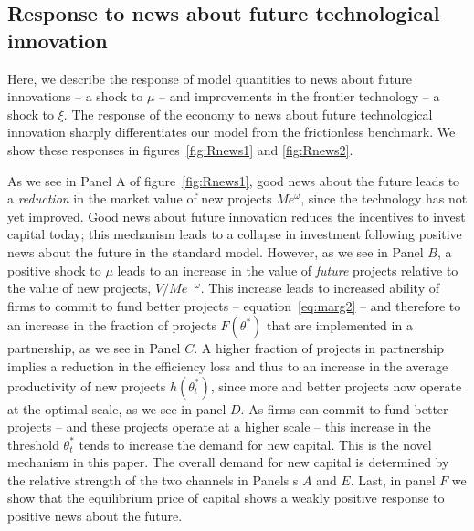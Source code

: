 \documentclass[12pt]{article}
\begin{document}



\subsection{Response to news about future technological innovation}

Here, we describe the response of model quantities to news about future innovations -- a shock to $\mu$  -- and improvements in the frontier technology -- a shock to $\xi$.
The response of the economy to news about future technological innovation   sharply differentiates our model from the frictionless benchmark. We show these responses in figures~\ref{fig:Rnews1} and \ref{fig:Rnews2}.

As we see in Panel A of figure~\ref{fig:Rnews1}, good news about the future leads to a \emph{reduction} in the market value of new projects $M  e^{\omega}$, since the technology has not yet improved. Good news about future innovation reduces the incentives to invest capital today; this mechanism leads to a collapse in investment following positive news about the future in the standard model. However, as we see in Panel $B$, a positive shock to $\mu$ leads to an increase in the value of \emph{future} projects relative to the value of new projects, $V/M e^{-\omega}$.  This increase leads to increased ability of firms to commit to fund better projects -- equation~\eqref{eq:marg2} -- and therefore to an increase in the fraction of projects $F(\theta^*)$ that are implemented in a partnership, as we see in Panel $C$. A higher fraction of projects in partnership implies a reduction in the efficiency loss and thus to an increase in the average productivity of new projects $h(\theta^*_t)$, since more and better projects now operate at the optimal scale, as we see in panel $D$. As firms can commit to fund better projects -- and these projects operate at a higher scale -- this increase in the threshold $\theta_t^*$ tends to  increase the demand for new capital.  This is the novel mechanism in this paper.  The overall demand for new capital is determined by the relative strength of the two channels in Panels s $A$ and $E$. Last, in panel $F$ we show that the equilibrium price of capital shows a weakly positive response to positive news about the future.
\end{document}
